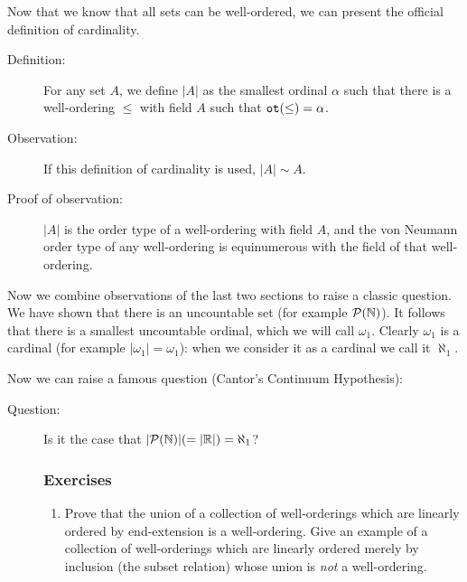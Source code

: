 \documentclass[12pt]{book}
\begin{document}
Now that we know that all sets can be well-ordered, we can present the official definition of cardinality.

\begin{description}

\item[Definition:]  For any set $A$, we define $|A|$ as the smallest ordinal $\alpha$ such that there is a well-ordering $\leq$ with field $A$ such that ${\tt ot}(\leq)=\alpha$.

\item[Observation:]  If this definition of cardinality is used, $|A| \sim A$.

\item [Proof of observation:]  $|A|$ is the order type of a well-ordering with field $A$, and the von Neumann order type of any well-ordering is equinumerous with the field of that well-ordering.  

\end{description}

Now we combine observations of the last two sections to raise a classic question.  We have shown that there is an uncountable set (for example
${\cal P}(\mathbb N)$).  It follows that there is a smallest uncountable ordinal, which we will call $\omega_1$.  Clearly $\omega_1$ is a cardinal
(for example $|\omega_1|=\omega_1$):   when we consider it as a cardinal we call it $\aleph_1$.

Now we can raise a famous question (Cantor's Continuum Hypothesis):

\begin{description}

\item[Question:]  Is it the case that $|{\cal P}({\mathbb N})| (= |{\mathbb R}|) = \aleph_1$?

\subsubsection{Exercises}

\begin{enumerate}

\item  Prove that the union of a collection of well-orderings which are linearly ordered by end-extension is a well-ordering.  Give an example of a collection of well-orderings which are linearly ordered merely by inclusion (the subset relation) whose union is {\em not\/} a well-ordering.

\end{enumerate}

\end{description}
\end{document}
